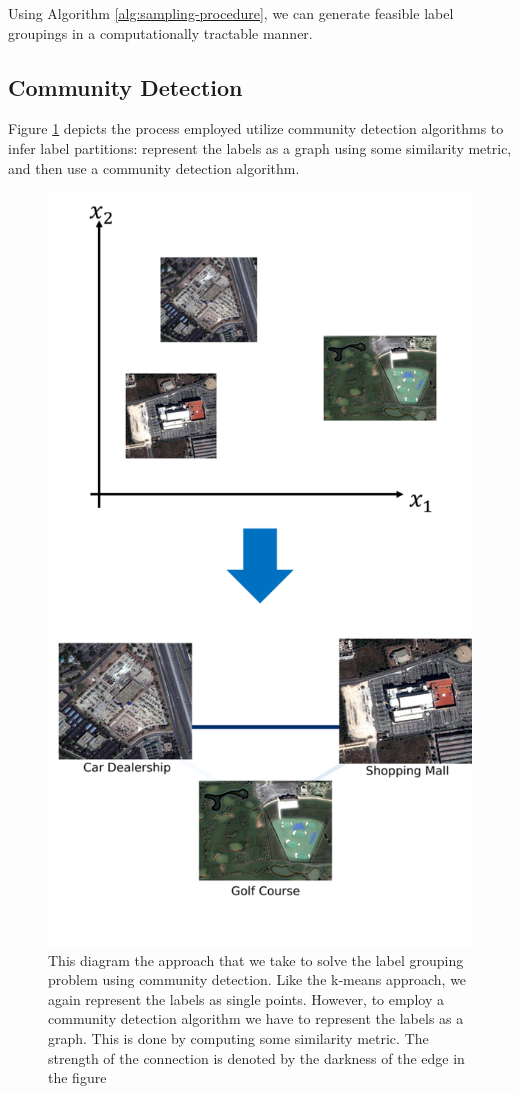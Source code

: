 \documentclass[../thesis.tex]{subfiles}
\begin{document}
Using Algorithm \ref{alg:sampling-procedure}, we can generate feasible label
groupings in a computationally tractable manner.

\subsection{Community Detection}
Figure \ref{fig:ex-community-detection} depicts the process employed utilize
community detection algorithms to infer label partitions: represent the labels
as a graph using some similarity metric, and then use a community detection
algorithm.
\begin{figure}
    \centering
    \includegraphics[width=.8\linewidth]{images/ex-community-detection.pdf}
    \caption[Community Detection Based Label Grouping]{This diagram the approach
    that we take to solve the label grouping problem using community detection.
    Like the k-means approach, we again represent the labels as single points.
    However, to employ a community detection algorithm we have to represent the
    labels as a graph. This is done by computing some similarity metric. The
    strength of the connection is denoted by the darkness of the edge in the
    figure}
    \label{fig:ex-community-detection}
\end{figure}
\end{document}
